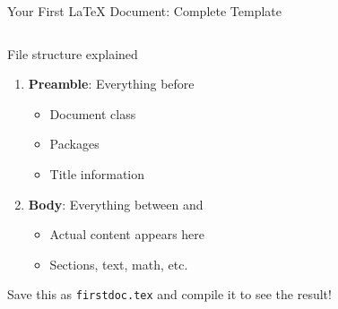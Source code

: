 \begin{frame}{Your First LaTeX Document: Complete Template}
\begin{columns}
		\begin{column}{0.45\textwidth}
			\begin{alertblock}{File structure explained}
				\begin{enumerate}
					\item \textbf{Preamble}: Everything before \verb||
						\begin{itemize}
							\item Document class
							\item Packages
							\item Title information
						\end{itemize}
						\item \textbf{Body}: Everything between \verb|| and \verb||
						\begin{itemize}
							\item Actual content appears here
							\item Sections, text, math, etc.
						\end{itemize}
					\end{enumerate}
				\end{alertblock}
				
				\begin{tip}
					Save this as \texttt{firstdoc.tex} and compile it to see the result!
				\end{tip}
			\end{column}
		\end{columns}
	\end{frame}


